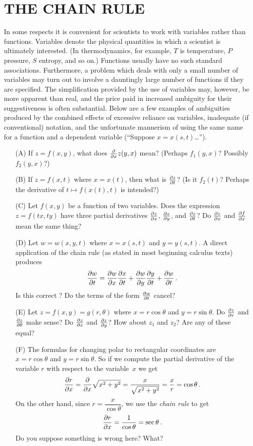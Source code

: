\section{THE CHAIN RULE}  In some respects it is convenient for scientists  to work with variables
rather than functions.  Variables denote the physical quantities in which a scientist is
ultimately interested.  (In thermodynamics, for example, $T$ is temperature, $P$ pressure, $S$
entropy, and so on.)  Functions usually have no such standard associations.  Furthermore, a
problem which deals with only a small number of variables may turn out to involve a dauntingly
large number of functions if they are specified. The simplification provided by the use of
variables may, however, be more apparent than real, and the price paid in increased ambiguity
for their suggestiveness is often substantial. Below are a few examples of ambiguities
produced by the combined effects of excessive reliance on variables, inadequate (if
conventional) notation, and the unfortunate mannerism of using the same name for a function
and a dependent variable (``Suppose $x = x(s,t)$\dots'').
 \begin{enumerate}
  \item[(A)]  If $z = f(x,y)$, what does $\frac{\partial}{\partial x}z(y,x)$ mean? (Perhaps $f_1(y,x)$?
Possibly $f_2(y,x)$?)
  \item[(B)]  If $z = f(x,t)$ where $x = x(t)$, then what is $\frac{\partial z}{\partial t}$?  (Is it $f_2(t)$?  Perhaps
the derivative of $t \mapsto f(x(t),t)$ is intended?)
  \item[(C)]  Let $f(x,y)$ be a function of two variables. Does the expression $z = f(tx,ty)$ have
three partial derivatives $\frac{\partial z}{\partial x}$, $\frac{\partial z}{\partial y}$, and $\frac{\partial z}{\partial t}$? Do $\frac{\partial z}{\partial x}$ and $\frac{\partial f}{\partial x}$ mean the
same thing?
  \item[(D)]  Let $w = w(x,y,t)$ where $x = x(s,t)$ and $y = y(s,t)$.  A direct application of the
chain rule (as stated in most beginning calculus texts) produces
    \[ \frac{\partial w}{\partial t} = \frac{\partial w}{\partial x} \frac{\partial x}{\partial t} + \frac{\partial w}{\partial y} \frac{\partial y}{\partial t} + \frac{\partial w}{\partial t}\,. \]
Is this correct ? Do the terms of the form $\frac{\partial w}{\partial t}$ cancel?
  \item[(E)]  Let $z = f(x,y) = g(r,\theta)$ where $x = r\cos\theta$ and $y = r\sin\theta$.  Do
$\frac{\partial z}{\partial r}$ and $\frac{\partial z}{\partial\theta}$ make sense? Do $\frac{\partial z}{\partial x}$ and $\frac{\partial z}{\partial y}$?  How about $z_1$ and $z_2$?
Are any of these equal?
  \item[(F)]  The formulas for changing polar to rectangular coordinates are $x = r\cos\theta$ and $y =
r\sin\theta$. So if we compute the partial derivative of the variable $r$ with respect to the
variable~$x$ we get
 \[ \frac{\partial r}{\partial x} = \dfrac{\partial }{\partial x}\sqrt{x^2 + y^2}
             = \dfrac x{\sqrt{x^2 + y^2}} =  \dfrac xr = \cos\theta\,. \]
On the other hand, since $r = \dfrac x{\cos\theta}$, we use the \emph{chain rule} to get
  \[ \frac{\partial r}{\partial x} = \dfrac1{\cos\theta} = \sec\theta\,. \]
Do you suppose something is wrong here? What?
 \end{enumerate}

